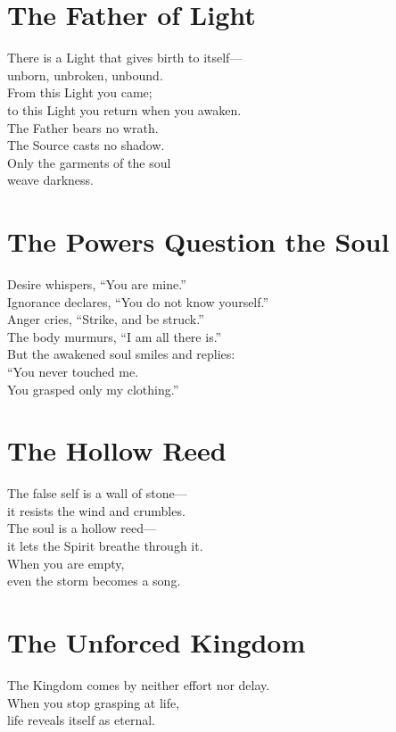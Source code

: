 \documentclass[10pt, openright]{book}
\begin{document}
\section{The Father of Light}
There is a Light that gives birth to itself— \\
unborn, unbroken, unbound. \\
From this Light you came; \\
to this Light you return when you awaken. \\

The Father bears no wrath. \\
The Source casts no shadow. \\
Only the garments of the soul \\
weave darkness.

\section{The Powers Question the Soul}
Desire whispers, ``You are mine.'' \\
Ignorance declares, ``You do not know yourself.'' \\
Anger cries, ``Strike, and be struck.'' \\
The body murmurs, ``I am all there is.'' \\

But the awakened soul smiles and replies: \\
``You never touched me. \\
You grasped only my clothing.''

\section{The Hollow Reed}
The false self is a wall of stone— \\
it resists the wind and crumbles. \\
The soul is a hollow reed— \\
it lets the Spirit breathe through it. \\

When you are empty, \\
even the storm becomes a song.

\section{The Unforced Kingdom}
The Kingdom comes by neither effort nor delay. \\
When you stop grasping at life, \\
life reveals itself as eternal. \\
\end{document}

